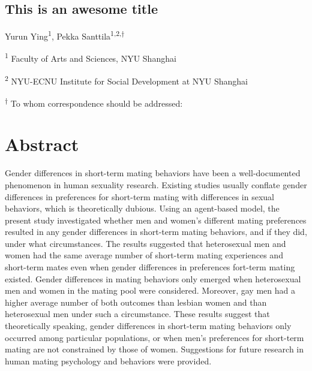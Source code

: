 \documentclass[
  11pt,
]{article}
\author{}
\date{\vspace{-2.5em}}
\begin{document}
\begin{titlepage}

\begin{center}

\vspace*{30mm}

\hypertarget{this-is-an-awesome-title}{%
\section*{\texorpdfstring{\textbf{This is an awesome
title}}{This is an awesome title}}\label{this-is-an-awesome-title}}

\vspace{30mm}

Yurun Ying\textsuperscript{1}, Pekka
Santtila\textsuperscript{1,2,\(\dagger\)}

\textsuperscript{1} Faculty of Arts and Sciences, NYU Shanghai

\textsuperscript{2} NYU-ECNU Institute for Social Development at NYU
Shanghai

\end{center}

\vspace{40mm}

\textsuperscript{\(\dagger\)} To whom correspondence should be
addressed:

\end{titlepage}

\newpage

\hypertarget{abstract}{%
\section*{Abstract}\label{abstract}}

Gender differences in short-term mating behaviors have been a
well-documented phenomenon in human sexuality research. Existing studies
usually conflate gender differences in preferences for short-term mating
with differences in sexual behaviors, which is theoretically dubious.
Using an agent-based model, the present study investigated whether men
and women's different mating preferences resulted in any gender
differences in short-term mating behaviors, and if they did, under what
circumstances. The results suggested that heterosexual men and women had
the same average number of short-term mating experiences and short-term
mates even when gender differences in preferences fort-term mating
existed. Gender differences in mating behaviors only emerged when
heterosexual men and women in the mating pool were considered. Moreover,
gay men had a higher average number of both outcomes than lesbian women
and than heterosexual men under such a circumstance. These results
suggest that theoretically speaking, gender differences in short-term
mating behaviors only occurred among particular populations, or when
men's preferences for short-term mating are not constrained by those of
women. Suggestions for future research in human mating psychology and
behaviors were provided.
\end{document}
